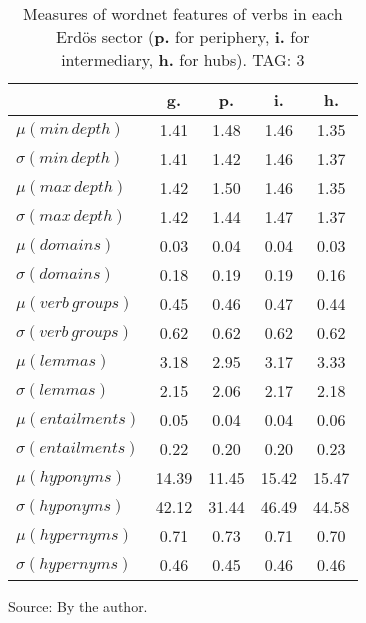 \begin{table}[h!]
\begin{center}
\caption{Measures of wordnet features of verbs in each Erd\"os sector ({{\bf p.}} for periphery, {{\bf i.}} for intermediary, {{\bf h.}} for hubs). TAG: 3}
	\label{tab:wnv}
\begin{tabular}{| l || c | c | c | c |}\hline
 & {\bf g.} & {\bf p.} & {\bf i.} & {\bf h.} \\\hline\hline
$\mu(min\,depth)$ & 1.41  & 1.48  & 1.46  & 1.35 \\
$\sigma(min\,depth)$ & 1.41  & 1.42  & 1.46  & 1.37 \\\hline
$\mu(max\,depth)$ & 1.42  & 1.50  & 1.46  & 1.35 \\
$\sigma(max\,depth)$ & 1.42  & 1.44  & 1.47  & 1.37 \\\hline
$\mu(domains)$ & 0.03  & 0.04  & 0.04  & 0.03 \\
$\sigma(domains)$ & 0.18  & 0.19  & 0.19  & 0.16 \\\hline
$\mu(verb\,groups)$ & 0.45  & 0.46  & 0.47  & 0.44 \\
$\sigma(verb\,groups)$ & 0.62  & 0.62  & 0.62  & 0.62 \\\hline
$\mu(lemmas)$ & 3.18  & 2.95  & 3.17  & 3.33 \\
$\sigma(lemmas)$ & 2.15  & 2.06  & 2.17  & 2.18 \\\hline
$\mu(entailments)$ & 0.05  & 0.04  & 0.04  & 0.06 \\
$\sigma(entailments)$ & 0.22  & 0.20  & 0.20  & 0.23 \\\hline
$\mu(hyponyms)$ & 14.39  & 11.45  & 15.42  & 15.47 \\
$\sigma(hyponyms)$ & 42.12  & 31.44  & 46.49  & 44.58 \\\hline
$\mu(hypernyms)$ & 0.71  & 0.73  & 0.71  & 0.70 \\
$\sigma(hypernyms)$ & 0.46  & 0.45  & 0.46  & 0.46 \\\hline
\end{tabular}
\begin{flushleft}
		Source: By the author.\
\end{flushleft}
\end{center}
\end{table}
